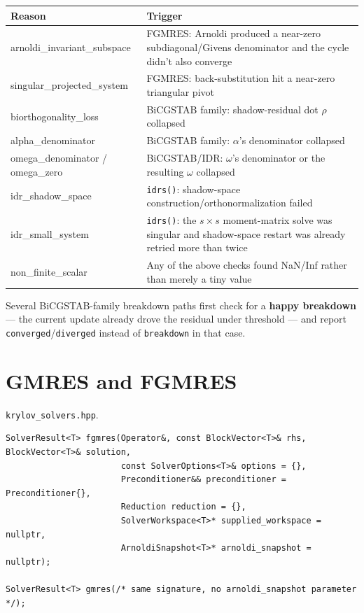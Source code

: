 \documentclass[11pt,a4paper]{report}
\begin{document}
\begin{longtable}{L{0.28\textwidth}P{0.62\textwidth}}
\toprule
Reason & Trigger \\
\midrule
\endhead
arnoldi\_invariant\_subspace & FGMRES: Arnoldi produced a near-zero subdiagonal/Givens denominator and the cycle didn't also converge \\
singular\_projected\_system & FGMRES: back-substitution hit a near-zero triangular pivot \\
biorthogonality\_loss & BiCGSTAB family: shadow-residual dot $\rho$ collapsed \\
alpha\_denominator & BiCGSTAB family: $\alpha$'s denominator collapsed \\
omega\_denominator / omega\_zero & BiCGSTAB/IDR: $\omega$'s denominator or the resulting $\omega$ collapsed \\
idr\_shadow\_space & \lstinline!idrs()!: shadow-space construction/orthonormalization failed \\
idr\_small\_system & \lstinline!idrs()!: the $s\times s$ moment-matrix solve was singular and shadow-space restart was already retried more than twice \\
non\_finite\_scalar & Any of the above checks found NaN/Inf rather than merely a tiny value \\
\bottomrule
\end{longtable}

Several BiCGSTAB-family breakdown paths first check for a \textbf{happy
breakdown} --- the current update already drove the residual under
threshold --- and report \lstinline!converged!/\lstinline!diverged! instead of
\lstinline!breakdown! in that case.

\section{GMRES and FGMRES}
\label{sec:5.4}

\texttt{krylov\_solvers.hpp}.

\begin{lstlisting}
SolverResult<T> fgmres(Operator&, const BlockVector<T>& rhs, BlockVector<T>& solution,
                       const SolverOptions<T>& options = {},
                       Preconditioner&& preconditioner = Preconditioner{},
                       Reduction reduction = {},
                       SolverWorkspace<T>* supplied_workspace = nullptr,
                       ArnoldiSnapshot<T>* arnoldi_snapshot = nullptr);

SolverResult<T> gmres(/* same signature, no arnoldi_snapshot parameter */);
\end{lstlisting}
\end{document}

